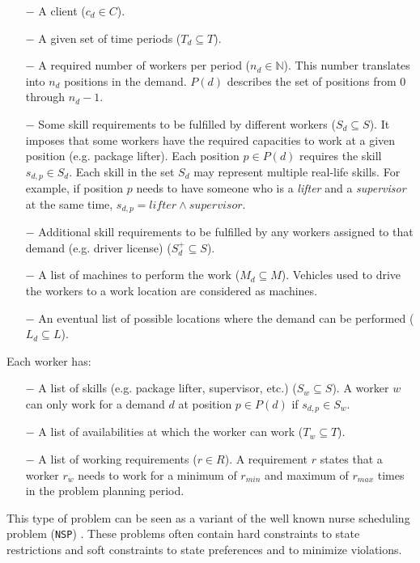 \documentclass[../thesis.tex]{subfiles}
\begin{document}
\begin{itemize}
  \item[$-$] A client ($c_d \in C$).
  \item[$-$] A given set of time periods ($T_d \subseteq T$).
  \item[$-$] A required number of workers per period ($n_d \in \mathbb{N}$).
      This number translates into $n_d$ positions in the demand. 
      $P(d)$ describes the set of positions from $0$ through $n_d - 1$. 
  \item[$-$] Some skill requirements to be fulfilled by different workers ($S_d \subseteq S$).
  It imposes that some workers have the required capacities to work at a given position (e.g. package lifter).
  Each position $p \in P(d)$ requires the skill $s_{d,p} \in S_d$. Each skill in the set $S_d$ may represent
  multiple real-life skills. For example, if position $p$ needs to have someone who is a \emph{lifter} and a \emph{supervisor} at the same 
  time, $s_{d,p} = lifter \land supervisor$.
  \item[$-$] Additional skill requirements to be fulfilled by any workers assigned to that demand (e.g. driver license) ($S^{+}_d \subseteq S$).
  \item[$-$] A list of machines to perform the work ($M_d \subseteq M$). Vehicles used to drive the workers to a work location are considered as machines.
  \item[$-$] An eventual list of possible locations where the demand can be performed ($L_d \subseteq L$).
\end{itemize}


Each worker has:

\begin{itemize}
  \item[$-$] A list of skills (e.g. package lifter, supervisor, etc.) ($S_w \subseteq S$).
             A worker $w$ can only work for a demand $d$ at position $p \in P(d)$ if $s_{d,p} \in S_w$. 
  \item[$-$] A list of availabilities at which the worker can work ($T_w \subseteq T$).  
  \item[$-$] A list of working requirements ($r \in R$). A requirement $r$ states that a worker $r_w$
  needs to work for a minimum of $r_{min}$ and maximum of $r_{max}$ times in the problem planning period.  
\end{itemize}


This type of problem can be seen as a variant of the 
well known nurse scheduling problem (\texttt{NSP}) \cite{Burke2004}. 
These problems often contain hard constraints to state restrictions and soft constraints to state preferences and to minimize violations.
\end{document}
